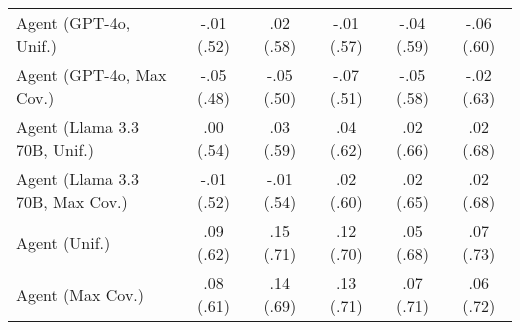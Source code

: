 \begin{table}[h!]
\begin{tabular}{lccccc}
    Agent (GPT-4o, Unif.) & -.01 {\small (.52)} & .02 {\small (.58)} & -.01 {\small (.57)} & -.04 {\small (.59)} & -.06 {\small (.60)} \\
    Agent (GPT-4o, Max Cov.) & -.05 {\small (.48)} & -.05 {\small (.50)} & -.07 {\small (.51)} & -.05 {\small (.58)} & -.02 {\small (.63)} \\
    Agent (Llama 3.3 70B, Unif.) & .00 {\small (.54)} & .03 {\small (.59)} & .04 {\small (.62)} & .02 {\small (.66)} & .02 {\small (.68)} \\
    Agent (Llama 3.3 70B, Max Cov.) & -.01 {\small (.52)} & -.01 {\small (.54)} & .02 {\small (.60)} & .02 {\small (.65)} & .02 {\small (.68)} \\
    Agent (Unif.) & .09 {\small (.62)} & \cellcolor{bronze!30}.15 {\small (.71)} & .12 {\small (.70)} & .05 {\small (.68)} & \cellcolor{silver!30}.07 {\small (.73)} \\
    Agent (Max Cov.) & .08 {\small (.61)} & .14 {\small (.69)} & \cellcolor{bronze!30}.13 {\small (.71)} & \cellcolor{gold!30}.07 {\small (.71)} & .06 {\small (.72)} \\
    \bottomrule
    \end{tabular}
\end{table}